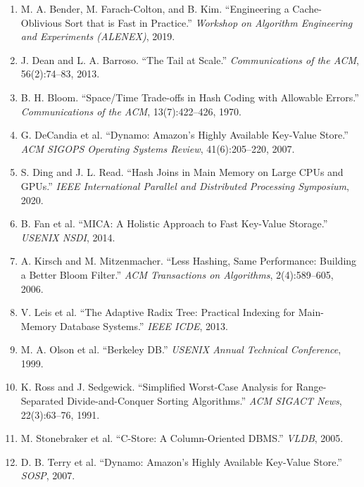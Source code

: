 \begin{enumerate}
\item M. A. Bender, M. Farach-Colton, and B. Kim. ``Engineering a Cache-Oblivious Sort that is Fast in Practice.'' \textit{Workshop on Algorithm Engineering and Experiments (ALENEX)}, 2019.

\item J. Dean and L. A. Barroso. ``The Tail at Scale.'' \textit{Communications of the ACM}, 56(2):74--83, 2013.

\item B. H. Bloom. ``Space/Time Trade-offs in Hash Coding with Allowable Errors.'' \textit{Communications of the ACM}, 13(7):422--426, 1970.

\item G. DeCandia et al. ``Dynamo: Amazon's Highly Available Key-Value Store.'' \textit{ACM SIGOPS Operating Systems Review}, 41(6):205--220, 2007.

\item S. Ding and J. L. Read. ``Hash Joins in Main Memory on Large CPUs and GPUs.'' \textit{IEEE International Parallel and Distributed Processing Symposium}, 2020.

\item B. Fan et al. ``MICA: A Holistic Approach to Fast Key-Value Storage.'' \textit{USENIX NSDI}, 2014.

\item A. Kirsch and M. Mitzenmacher. ``Less Hashing, Same Performance: Building a Better Bloom Filter.'' \textit{ACM Transactions on Algorithms}, 2(4):589--605, 2006.

\item V. Leis et al. ``The Adaptive Radix Tree: Practical Indexing for Main-Memory Database Systems.'' \textit{IEEE ICDE}, 2013.

\item M. A. Olson et al. ``Berkeley DB.'' \textit{USENIX Annual Technical Conference}, 1999.

\item K. Ross and J. Sedgewick. ``Simplified Worst-Case Analysis for Range-Separated Divide-and-Conquer Sorting Algorithms.'' \textit{ACM SIGACT News}, 22(3):63--76, 1991.

\item M. Stonebraker et al. ``C-Store: A Column-Oriented DBMS.'' \textit{VLDB}, 2005.

\item D. B. Terry et al. ``Dynamo: Amazon's Highly Available Key-Value Store.'' \textit{SOSP}, 2007.
\end{enumerate}
